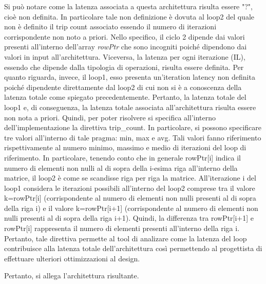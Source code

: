 Si può notare come la latenza associata a questa architettura risulta essere "?", cioè non definita. In particolare tale non definizione è dovuta al loop2 del quale non è definito il trip count associato essendo il numero di iterazioni corrispondente non noto a priori. Nello specifico, il ciclo 2 dipende dai valori presenti all'interno dell'array \textit{rowPtr} che sono incogniti poiché dipendono dai valori in input all'architettura. Viceversa, la latenza per ogni iterazione (IL), essendo che dipende dalla tipologia di operazioni, risulta essere definita. Per quanto riguarda, invece, il loop1, esso presenta un'iteration latency non definita poiché dipendente direttamente dal loop2 di cui non si è a conoscenza della latenza totale come spiegato precedentemente. Pertanto, la latenza totale del loop1 e, di conseguenza, la latenza totale associata all'architettura risulta essere non nota a priori. Quindi, per poter risolvere si specifica all'interno dell'implementazione la direttiva trip\_count. In particolare, si possono specificare tre valori all'interno di tale pragma: min, max e avg. Tali valori fanno riferimento rispettivamente al numero minimo, massimo e medio di iterazioni del loop di riferimento. In particolare, tenendo conto che in generale rowPtr[i] indica il numero di elementi non nulli al di sopra della i-esima riga all'interno della matrice, il loop2 è come se scandisse riga per riga la matrice. All'iterazione i del loop1 considera le iterazioni possibili all'interno del loop2 comprese tra il valore k=rowPtr[i] (corrispondente al numero di elementi non nulli presenti al di sopra della riga i) e il valore k=rowPtr[i+1] (corrispondente al numero di elementi non nulli presenti al di sopra della riga i+1). Quindi, la differenza tra rowPtr[i+1] e rowPtr[i] rappresenta il numero di elementi presenti all'interno della riga i. Pertanto, tale direttiva permette al tool di analizare come la latenza del loop contribuisce alla latenza totale dell'architettura così permettendo al progettista di effettuare ulteriori ottimizzazioni al design.

Pertanto, si allega l'architettura risultante.


